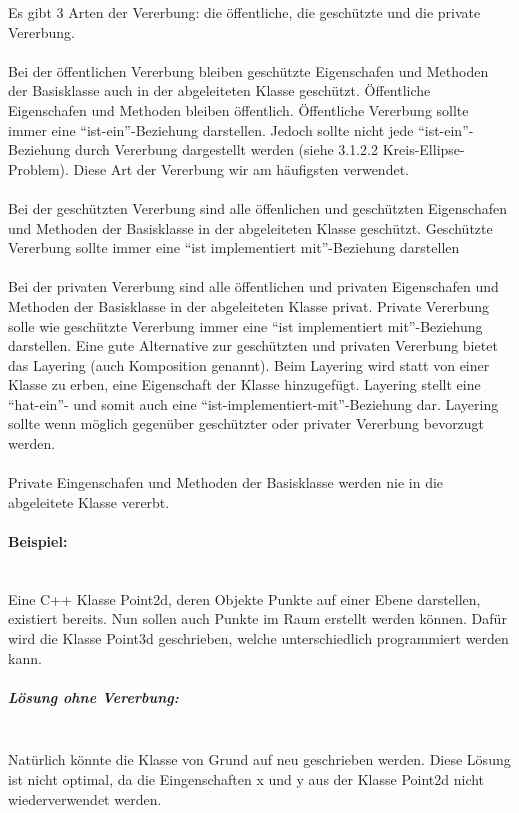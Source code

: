 		Es gibt 3 Arten der Vererbung: die öffentliche, die geschützte und die private Vererbung.
		\\\\
		Bei der öffentlichen Vererbung bleiben geschützte Eigenschafen und Methoden der Basisklasse auch in der
		abgeleiteten Klasse geschützt. Öffentliche Eigenschafen und Methoden bleiben öffentlich. Öffentliche Vererbung
		sollte immer eine ``ist-ein''-Beziehung darstellen. Jedoch sollte nicht jede ``ist-ein''-Beziehung durch Vererbung
		dargestellt werden (siehe 3.1.2.2 Kreis-Ellipse-Problem). Diese Art der Vererbung wir am häufigsten verwendet.
		\\\\
		Bei der geschützten Vererbung sind alle öffenlichen und geschützten Eigenschafen und Methoden der Basisklasse in
		der abgeleiteten Klasse geschützt. Geschützte Vererbung sollte immer eine ``ist implementiert mit''-Beziehung darstellen
		\\\\
		Bei der privaten Vererbung sind alle öffentlichen und privaten Eigenschafen und Methoden der Basisklasse in der
		abgeleiteten Klasse privat.
		Private Vererbung solle wie geschützte Vererbung immer eine ``ist implementiert mit''-Beziehung darstellen.
		Eine gute Alternative zur geschützten und privaten Vererbung bietet das Layering (auch Komposition genannt). Beim
		Layering wird statt von einer Klasse zu erben, eine Eigenschaft
		der Klasse hinzugefügt. Layering stellt eine ``hat-ein''- und somit auch eine ``ist-implementiert-mit''-Beziehung dar.
		Layering sollte wenn möglich gegenüber geschützter oder privater Vererbung bevorzugt werden.
		\\\\
		Private Eingenschafen und Methoden der Basisklasse werden nie in die abgeleitete Klasse vererbt.
		
		\paragraph*{Beispiel:}\mbox{}\\
			Eine C++ Klasse Point2d, deren Objekte Punkte auf einer Ebene darstellen, existiert bereits.
			\UseRawInputEncoding{}
			Nun sollen auch Punkte im Raum erstellt werden können. Dafür wird die Klasse Point3d geschrieben, welche
			unterschiedlich programmiert werden kann.
		
		\subparagraph*{Lösung ohne Vererbung:}\mbox{}\\
		Natürlich könnte die Klasse von Grund auf neu geschrieben werden.
		\UseRawInputEncoding{}
		Diese Lösung ist nicht optimal, da die Eingenschaften x und y aus der Klasse Point2d nicht wiederverwendet werden.
		
